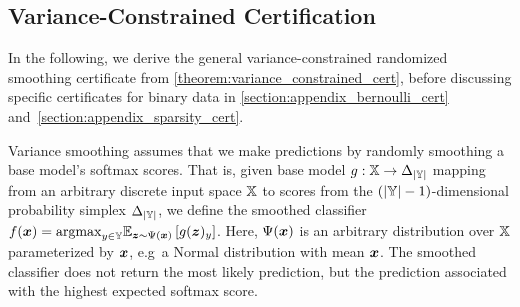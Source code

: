 \subsection{Variance-Constrained Certification}\label{section:variance_smoothing}
In the following, we derive the general variance-constrained randomized smoothing certificate from \autoref{theorem:variance_constrained_cert}, before discussing specific  certificates for binary data in \autoref{section:appendix_bernoulli_cert} and~\autoref{section:appendix_sparsity_cert}.

Variance smoothing assumes that we make predictions by randomly smoothing a base model's softmax scores.
That is, given base model $g : {\mathbb{X}} \rightarrow \Delta_{|{\mathbb{Y}}|}$ mapping from an arbitrary discrete input space ${\mathbb{X}}$ to 
scores from the $\left(|{\mathbb{Y}}|-1\right)$-dimensional probability simplex $\Delta_{|{\mathbb{Y}}|}$, we define the smoothed classifier  
$f({\bm{x}}) = \mathrm{argmax}_{y \in {\mathbb{Y}}}
\mathbb{E}_{{\bm{z}} \sim \Psi({\bm{x}})}
\left[g({\bm{z}})_y\right]$. Here, $\Psi({\bm{x}})$ is an arbitrary distribution over ${\mathbb{X}}$ parameterized by ${\bm{x}}$, e.g~a Normal distribution with mean ${\bm{x}}$.
The smoothed classifier does not return the most likely prediction, but the prediction associated with the highest expected softmax score.

